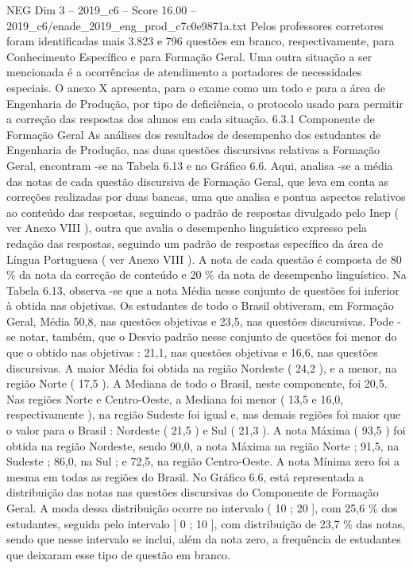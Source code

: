 \begin{textsample}{NEG Dim 3 – 2019\_c6 – Score 16.00 – 2019\_c6/enade\_2019\_eng\_prod\_c7c0e9871a.txt}
Pelos professores corretores foram identificadas mais 3.823 e 796 questões em branco, respectivamente, para Conhecimento Específico e para Formação Geral.
Uma outra situação a ser mencionada é a ocorrências de atendimento a portadores de necessidades especiais.
O anexo X apresenta, para o exame como um todo e para a área de Engenharia de Produção, por tipo de deficiência, o protocolo usado para permitir a correção das respostas dos alunos em cada situação. 6.3.1 Componente de Formação Geral As análises dos resultados de desempenho dos estudantes de Engenharia de Produção, nas duas questões discursivas relativas a Formação Geral, encontram -se na Tabela 6.13 e no Gráfico 6.6.
Aqui, analisa -se a média das notas de cada questão discursiva de Formação Geral, que leva em conta as correções realizadas por duas bancas, uma que analisa e pontua aspectos relativos ao conteúdo das respostas, seguindo o padrão de respostas divulgado pelo Inep ( ver Anexo VIII ), outra que avalia o desempenho linguístico expresso pela redação das respostas, seguindo um padrão de respostas específico da área de Língua Portuguesa ( ver Anexo VIII ).
A nota de cada questão é composta de 80 \% da nota da correção de conteúdo e 20 \% da nota de desempenho linguístico.
Na Tabela 6.13, observa -se que a nota Média nesse conjunto de questões foi inferior à obtida nas objetivas.
Os estudantes de todo o Brasil obtiveram, em Formação Geral, Média 50,8, nas questões objetivas e 23,5, nas questões discursivas.
Pode -se notar, também, que o Desvio padrão nesse conjunto de questões foi menor do que o obtido nas objetivas : 21,1, nas questões objetivas e 16,6, nas questões discursivas.
A maior Média foi obtida na região Nordeste ( 24,2 ), e a menor, na região Norte ( 17,5 ).
A Mediana de todo o Brasil, neste componente, foi 20,5.
Nas regiões Norte e Centro-Oeste, a Mediana foi menor ( 13,5 e 16,0, respectivamente ), na região Sudeste foi igual e, nas demais regiões foi maior que o valor para o Brasil : Nordeste ( 21,5 ) e Sul ( 21,3 ).
A nota Máxima ( 93,5 ) foi obtida na região Nordeste, sendo 90,0, a nota Máxima na região Norte ; 91,5, na Sudeste ; 86,0, na Sul ; e 72,5, na região Centro-Oeste.
A nota Mínima zero foi a mesma em todas as regiões do Brasil.
No Gráfico 6.6, está representada a distribuição das notas nas questões discursivas do Componente de Formação Geral.
A moda dessa distribuição ocorre no intervalo ( 10 ; 20 ], com 25,6 \% dos estudantes, seguida pelo intervalo [ 0 ; 10 ], com distribuição de 23,7 \% das notas, sendo que nesse intervalo se inclui, além da nota zero, a frequência de estudantes que deixaram esse tipo de questão em branco.

\end{textsample}
